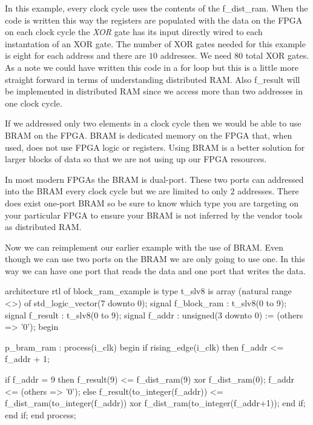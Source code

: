 In this example, every clock cycle uses the contents of the f\_dist\_ram. When the code is written this way the registers are populated with the data on the \ac{FPGA} on each clock cycle the \emph{XOR} gate has its input directly wired to each instantation of an \ac{XOR} gate. The number of \ac{XOR} gates needed for this example is eight for each address and there are $10$ addresses. We need $80$ total \ac{XOR} gates. As a note we could have written this code in a for loop but this is a little more straight forward in terms of understanding distributed \ac{RAM}. Also f\_result will be implemented in distributed \ac{RAM} since we access more than two addresses in one clock cycle. 

If we addressed only two elements in a clock cycle then we would be able to use \ac{BRAM} on the \ac{FPGA}. \ac{BRAM} is dedicated memory on the \ac{FPGA} that, when used, does not use \ac{FPGA} logic or registers. Using \ac{BRAM} is a better solution for larger blocks of data so that we are not using up our \ac{FPGA} resources. 

In most modern \ac{FPGA}s the \ac{BRAM} is dual-port. These two ports can addressed into the \ac{BRAM} every clock cycle but we are limited to only $2$ addresses. There does exist one-port \ac{BRAM} so be sure to know which type you are targeting on your particular \ac{FPGA} to ensure your \ac{BRAM} is not inferred by the vendor tools as distributed \ac{RAM}.

Now we can reimplement our earlier example with the use of \ac{BRAM}. Even though we can use two ports on the \ac{BRAM} we are only going to use one. In this way we can have one port that reads the data and one port that writes the data. 

\begin{VHDLlisting}[tabsize=4]
architecture rtl of block_ram_example is
	type t_slv8 is array (natural range <>) of std_logic_vector(7 downto 0);
	signal f_block_ram : t_slv8(0 to 9);
	signal f_result    : t_slv8(0 to 9);
	signal f_addr      : unsigned(3 downto 0) := (others => '0');
begin

p_bram_ram : process(i_clk)
begin
	if rising_edge(i_clk) then
		f_addr <= f_addr + 1;
		
		if f_addr = 9 then
			f_result(9) <= f_dist_ram(9) xor f_dist_ram(0);
			f_addr <= (others => '0');
		else
			f_result(to_integer(f_addr)) <= f_dist_ram(to_integer(f_addr)) xor 
										    f_dist_ram(to_integer(f_addr+1));
		end if;
	end if;
end process;
\end{VHDLlisting}

